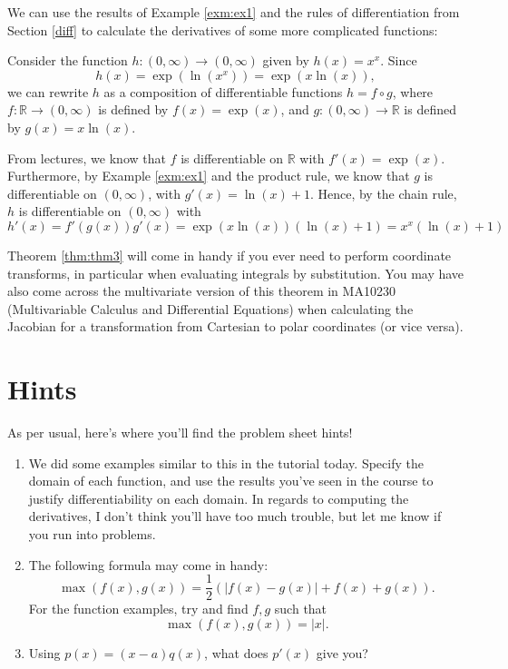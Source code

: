\documentclass[
  12pt,
  a4paper]{extarticle}
\providecommand{\tightlist}{%
  \setlength{\itemsep}{0pt}\setlength{\parskip}{0pt}}
\theoremstyle{plain}
\theoremstyle{definition}
\theoremstyle{plain}
\theoremstyle{plain}
\theoremstyle{plain}
\theoremstyle{plain}
\theoremstyle{definition}
\theoremstyle{definition}
\theoremstyle{remark}
\theoremstyle{remark}
\let\BeginKnitrBlock\begin \let\EndKnitrBlock\end
\renewcommand{\;}{\,}
\begin{document}
We can use the results of Example \ref{exm:ex1} and the rules of differentiation from Section \ref{diff} to calculate the derivatives of some more complicated functions:
\BeginKnitrBlock{example}
{\label{exm:ex2} }Consider the function \(h:(0,\infty) \to (0,\infty)\) given by \(h(x) = x^x.\) Since \[h(x) = \exp(\ln(x^x)) = \exp(x\ln(x)),\] we can rewrite \(h\) as a composition of differentiable functions \(h = f \circ g\), where \(f:\mathbb{R} \to (0,\infty)\) is defined by \(f(x) = \exp(x)\), and \(g: (0,\infty) \to \mathbb{R}\) is defined by \(g(x) = x\ln(x).\)

From lectures, we know that \(f\) is differentiable on \(\mathbb{R}\) with \(f'(x) = \exp(x).\) Furthermore, by Example \ref{exm:ex1} and the product rule, we know that \(g\) is differentiable on \((0,\infty)\), with \(g'(x) = \ln(x) + 1.\) Hence, by the chain rule, \(h\) is differentiable on \((0,\infty)\) with \[h'(x) = f'(g(x))g'(x) = \exp(x\ln(x))\left(\ln(x) + 1\right) = x^x\left(\ln(x) + 1\right)\]
\EndKnitrBlock{example}

Theorem \ref{thm:thm3} will come in handy if you ever need to perform coordinate transforms, in particular when evaluating integrals by substitution. You may have also come across the multivariate version of this theorem in MA10230 (Multivariable Calculus and Differential Equations) when calculating the Jacobian for a transformation from Cartesian to polar coordinates (or vice versa).

\hypertarget{hints}{%
\section{Hints}\label{hints}}

As per usual, here's where you'll find the problem sheet hints!

\begin{enumerate}
\def\labelenumi{\arabic{enumi})}
\tightlist
\item
  We did some examples similar to this in the tutorial today. Specify the domain of each function, and use the results you've seen in the course to justify differentiability on each domain. In regards to computing the derivatives, I don't think you'll have too much trouble, but let me know if you run into problems.
\item
  The following formula may come in handy:\[\max(f(x),g(x)) = \frac{1}{2}\left(\lvert f(x) - g(x) \rvert + f(x) + g(x)\right).\]
  For the function examples, try and find \(f,g\) such that \[\max(f(x),g(x)) = \lvert x \rvert.\]
\item
  Using \(p(x) = (x-a)q(x)\), what does \(p'(x)\) give you?
\end{enumerate}
\end{document}
